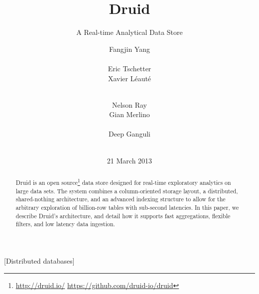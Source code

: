\documentclass{sig-alternate-2013}
\begin{document}

\title{Druid}
\subtitle{A Real-time Analytical Data Store}


\author{
\alignauthor Fangjin Yang\\
  \\
\alignauthor Eric Tschetter\\
\alignauthor Xavier Léauté\\
  \\
\and
\alignauthor Nelson Ray\\
\alignauthor Gian Merlino\\
  \\
\alignauthor Deep Ganguli\\
  \\
}
\date{21 March 2013}


\maketitle

\begin{abstract}
Druid is an open source\footnote{\href{http://druid.io/}{http://druid.io/} \href{https://github.com/druid-io/druid}{https://github.com/druid-io/druid}}
data store designed for real-time exploratory analytics on large data sets.
The system combines a column-oriented storage layout, a distributed,
shared-nothing architecture, and an advanced indexing structure to allow for
the arbitrary exploration of billion-row tables with sub-second latencies. In
this paper, we describe Druid's architecture, and detail how it supports fast
aggregations, flexible filters, and low latency data ingestion.
\end{abstract}

[Distributed databases]
\end{document}

